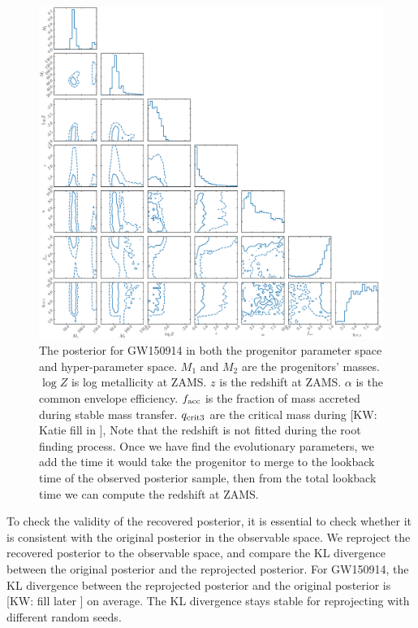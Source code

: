 \documentclass[twocolumn]{aastex631}
\newcommand{\kw}[1]{{\color{rb4}[KW: #1 ]}}
\begin{document}
\begin{figure}[h]
\includegraphics[width=\textwidth]{static/GW150914_corner_zoomed.pdf}
\caption{The posterior for GW150914 in both the progenitor parameter space and hyper-parameter space.
$M_1$ and $M_2$ are the progenitors' masses. $\log{Z}$ is log metallicity at ZAMS.
$z$ is the redshift at ZAMS. 
$\alpha$ is the common envelope efficiency.
$f_{\rm acc}$ is the fraction of mass accreted during stable mass transfer.
$q_{\rm crit 3}$ are the critical mass during \kw{Katie fill in},
Note that the redshift is not fitted during the root finding process.
Once we have find the evolutionary parameters, we add the time it would take the progenitor to merge to the lookback time of the observed posterior sample,
then from the total lookback time we can compute the redshift at ZAMS.
}
\label{fig:GW150914_posterior}
\end{figure}

To check the validity of the recovered posterior, it is essential to check whether it is consistent with the original posterior in the observable space.
We reproject the recovered posterior to the observable space, and compare the KL divergence between the original posterior and the reprojected posterior.
For GW150914, the KL divergence between the reprojected posterior and the original posterior is \kw{fill later} on average.
The KL divergence stays stable for reprojecting with different random seeds.
\end{document}

